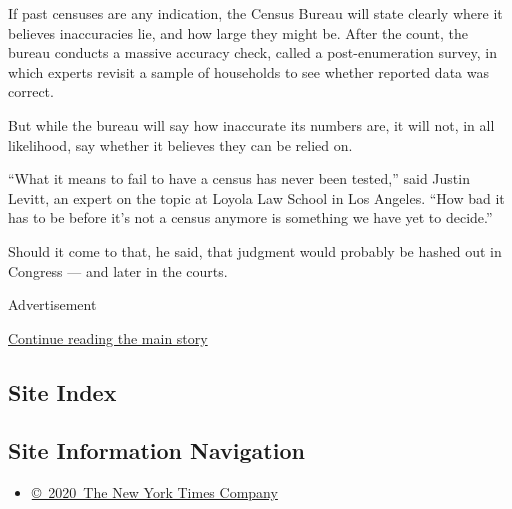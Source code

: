 If past censuses are any indication, the Census Bureau will state
clearly where it believes inaccuracies lie, and how large they might be.
After the count, the bureau conducts a massive accuracy check, called a
post-enumeration survey, in which experts revisit a sample of households
to see whether reported data was correct.

But while the bureau will say how inaccurate its numbers are, it will
not, in all likelihood, say whether it believes they can be relied on.

``What it means to fail to have a census has never been tested,'' said
Justin Levitt, an expert on the topic at Loyola Law School in Los
Angeles. ``How bad it has to be before it's not a census anymore is
something we have yet to decide.''

Should it come to that, he said, that judgment would probably be hashed
out in Congress --- and later in the courts.

Advertisement

\protect\hyperlink{after-bottom}{Continue reading the main story}

\hypertarget{site-index}{%
\subsection{Site Index}\label{site-index}}

\hypertarget{site-information-navigation}{%
\subsection{Site Information
Navigation}\label{site-information-navigation}}

\begin{itemize}
\tightlist
\item
  \href{https://help.nytimes3xbfgragh.onion/hc/en-us/articles/115014792127-Copyright-notice}{©~2020~The
  New York Times Company}
\end{itemize}

